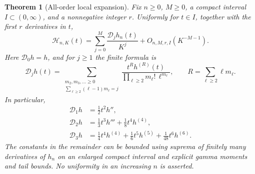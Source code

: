 \documentclass[11pt,a4paper]{article}
\newtheorem{theorem}{Theorem}[section]
\theoremstyle{definition}
\theoremstyle{remark}
\numberwithin{equation}{section}
\begin{document}
\begin{theorem}[All-order local expansion]\label{zero:all-orders}
Fix $n\geq0$, $M\geq0$, a compact interval $I\subset(0,\infty)$,
and a nonnegative integer $r$.  Uniformly for $t\in I$, together with
the first $r$ derivatives in $t$,
\begin{equation}\label{zero:expansion}
 \mathcal H_{n,K}(t)=\sum_{j=0}^{M}\frac{\mathcal D_jh_n(t)}{K^j}
                         +O_{n,M,r,I}(K^{-M-1}).
\end{equation}
Here $\mathcal D_0h=h$, and for $j\geq1$ the finite formula is
\begin{equation}\label{zero:D-general}
 \mathcal D_jh(t)=
 \sum_{\substack{m_2,m_3,\ldots\geq0\\
                 \sum_{\ell\geq2}(\ell-1)m_\ell=j}}
 \frac{t^R h^{(R)}(t)}{
             \prod_{\ell\geq2}m_\ell!\,\ell^{m_\ell}},
 \qquad R=\sum_{\ell\geq2}\ell m_\ell.
\end{equation}
In particular,
\begin{align}
 \mathcal D_1h&=\tfrac12t^2h'',\label{zero:D1}\\
 \mathcal D_2h&=\tfrac13t^3h'''+\tfrac18t^4h^{(4)},\label{zero:D2}\\
 \mathcal D_3h&=\tfrac14t^4h^{(4)}+\tfrac16t^5h^{(5)}
                                      +\tfrac1{48}t^6h^{(6)}.
\end{align}
The constants in the remainder can be bounded using suprema of finitely
many derivatives of $h_n$ on an enlarged compact interval and explicit
gamma moments and tail bounds.  No uniformity in an increasing $n$
is asserted.
\end{theorem}
\end{document}
